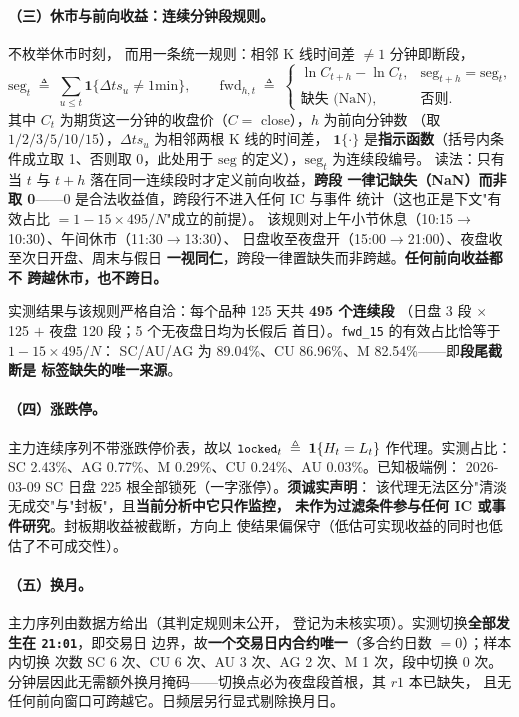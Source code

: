 \documentclass[11pt, a4paper]{ctexart}
\newcommand{\code}[1]{\texttt{\small #1}}
\newcommand{\eqdef}{\;\triangleq\;}
\begin{document}
\paragraph{（三）休市与前向收益：连续分钟段规则。}不枚举休市时刻，
而用一条统一规则：相邻 K 线时间差 $\ne 1$ 分钟即断段，
\[
\mathrm{seg}_t \eqdef \textstyle\sum_{u\le t}
\mathbf{1}\{\Delta ts_u \ne 1\text{min}\},\qquad
\mathrm{fwd}_{h,t} \eqdef
\begin{cases}
\ln C_{t+h}-\ln C_t, & \mathrm{seg}_{t+h}=\mathrm{seg}_t,\\
\text{缺失 (NaN)}, & \text{否则}.
\end{cases}
\]
其中 $C_t$ 为期货这一分钟的收盘价（$C=$ close），$h$ 为前向分钟数
（取 $1/2/3/5/10/15$），$\Delta ts_u$ 为相邻两根 K 线的时间差，
$\mathbf{1}\{\cdot\}$ 是\textbf{指示函数}（括号内条件成立取 1、否则取
0，此处用于 $\mathrm{seg}$ 的定义），$\mathrm{seg}_t$ 为连续段编号。
读法：只有当 $t$ 与 $t+h$ 落在同一连续段时才定义前向收益，\textbf{跨段
一律记缺失（NaN）而非取 0}——0 是合法收益值，跨段行不进入任何 IC 与事件
统计（这也正是下文"有效占比 $=1-15\times495/N$"成立的前提）。
该规则对上午小节休息（10:15$\to$10:30）、午间休市（11:30$\to$13:30）、
日盘收至夜盘开（15:00$\to$21:00）、夜盘收至次日开盘、周末与假日
\textbf{一视同仁}，跨段一律置缺失而非跨越。\textbf{任何前向收益都不
跨越休市，也不跨日。}

实测结果与该规则严格自洽：每个品种 125 天共 \textbf{495 个连续段}
（日盘 3 段 $\times$ 125 $+$ 夜盘 120 段；5 个无夜盘日均为长假后
首日）。\code{fwd\_15} 的有效占比恰等于 $1-15\times495/N$：
SC/AU/AG 为 89.04\%、CU 86.96\%、M 82.54\%——即\textbf{段尾截断是
标签缺失的唯一来源}。

\paragraph{（四）涨跌停。}主力连续序列不带涨跌停价表，故以
$\code{locked}_t \eqdef \mathbf{1}\{H_t = L_t\}$ 作代理。实测占比：
SC 2.43\%、AG 0.77\%、M 0.29\%、CU 0.24\%、AU 0.03\%。已知极端例：
2026-03-09 SC 日盘 225 根全部锁死（一字涨停）。\textbf{须诚实声明}：
该代理无法区分"清淡无成交"与"封板"，且\textbf{当前分析中它只作监控，
未作为过滤条件参与任何 IC 或事件研究}。封板期收益被截断，方向上
使结果偏保守（低估可实现收益的同时也低估了不可成交性）。

\paragraph{（五）换月。}主力序列由数据方给出（其判定规则未公开，
登记为未核实项）。实测切换\textbf{全部发生在 \code{21:01}}，即交易日
边界，故\textbf{一个交易日内合约唯一}（多合约日数 $=0$）；样本内切换
次数 SC 6 次、CU 6 次、AU 3 次、AG 2 次、M 1 次，段中切换 0 次。
分钟层因此无需额外换月掩码——切换点必为夜盘段首根，其 $r1$ 本已缺失，
且无任何前向窗口可跨越它。日频层另行显式剔除换月日。
\end{document}
